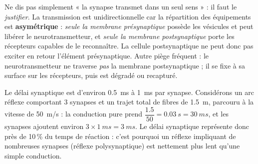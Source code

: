 \documentclass[11pt]{article}
\begin{document}
\begin{attention}
Ne dis pas simplement « la synapse transmet dans un seul sens » : il faut le \emph{justifier}. La transmission est unidirectionnelle car la répartition des équipements est \textbf{asymétrique} : \emph{seule la membrane présynaptique} possède les vésicules et peut libérer le neurotransmetteur, et \emph{seule la membrane postsynaptique} porte les récepteurs capables de le reconnaître. La cellule postsynaptique ne peut donc pas exciter en retour l'élément présynaptique. Autre piège fréquent : le neurotransmetteur ne traverse \emph{pas} la membrane postsynaptique ; il se fixe à sa surface sur les récepteurs, puis est dégradé ou recapturé.
\end{attention}

\begin{exemplebox}
Le délai synaptique est d'environ \SI{0,5}{ms} à \SI{1}{ms} par synapse. Considérons un arc réflexe comportant 3 synapses et un trajet total de fibres de \SI{1,5}{m}, parcouru à la vitesse de \SI{50}{m/s} : la conduction pure prend $\dfrac{\num{1,5}}{50} = \SI{0,03}{s} = \SI{30}{ms}$, et les synapses ajoutent environ $3 \times \SI{1}{ms} = \SI{3}{ms}$. Le délai synaptique représente donc près de 10\,\% du temps de réaction : c'est pourquoi un réflexe impliquant de nombreuses synapses (réflexe polysynaptique) est nettement plus lent qu'une simple conduction.
\end{exemplebox}
\end{document}
